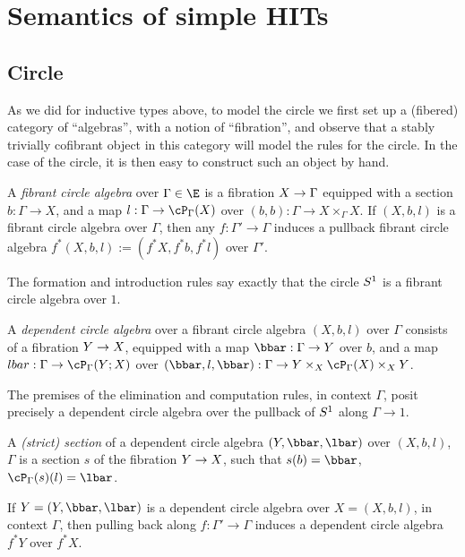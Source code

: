 \documentclass{amsart}
\begin{document}

\section{Semantics of simple HITs}
\label{sec:simple-semantics}

\subsection{Circle}

As we did for inductive types above, to model the circle we first set up a (fibered) category of “algebras”, with a notion of “fibration”, and observe that a stably trivially cofibrant object in this category will model the rules for the circle.
%
In the case of the circle, it is then easy to construct such an object by hand.

\begin{definition}
A \emph{fibrant circle algebra} over $\Gamma \in \E$ is a fibration $X \to \Gamma$ equipped with a section $b : \Gamma \to X$, and a map $l : \Gamma \to \paths[\Gamma]{X}$ over $(b,b) : \Gamma \to X \times_\Gamma X$.
%
If $(X,b,l)$ is a fibrant circle algebra over $\Gamma$, then any $f : \Gamma' \to \Gamma$ induces a pullback fibrant circle algebra $f^*(X,b,l) := (f^*X,f^*b,f^*l)$ over $\Gamma'$.
\end{definition}

The formation and introduction rules say exactly that the circle $S^1$ is a fibrant circle algebra over $1$.

\begin{definition}
A \emph{dependent circle algebra} over a fibrant circle algebra $(X,b,l)$ over $\Gamma$ consists of a fibration $Y \to X$, equipped with a map $\bbar : \Gamma \to Y$ over $b$, and a map $lbar : \Gamma \to \pathsover[\Gamma]{X}{Y}$ over $(\bbar,l,\bbar) : \Gamma \to Y \times_X \paths[\Gamma]{X} \times_X Y$. 
\end{definition}

The premises of the elimination and computation rules, in context $\Gamma$, posit precisely a dependent circle algebra over the pullback of $S^1$ along $\Gamma \to 1$.

\begin{definition}
A \emph{(strict) section} of a dependent circle algebra $(Y,\bbar,\lbar)$ over $(X,b,l)$, $\Gamma$ is a section $s$ of the fibration $Y \to X$, such that $s(b) = \bbar$, $\paths[\Gamma]{s}(l) = \lbar$.

If $Y = (Y,\bbar,\lbar)$ is a dependent circle algebra over $X = (X,b,l)$, in context $\Gamma$, then pulling back along $f : \Gamma' \to \Gamma$ induces a dependent circle algebra $f^*Y$ over $f^*X$.
\end{definition}
\end{document}
